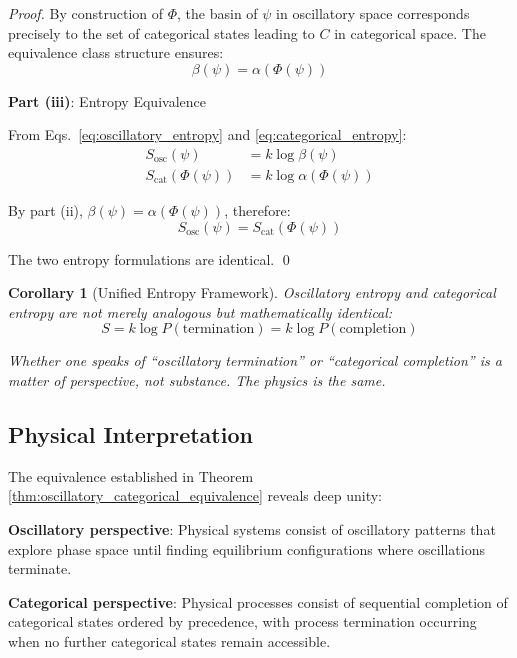 \documentclass[12pt,a4paper]{article}
\newtheorem{corollary}{Corollary}
\begin{document}
\begin{proof}
By construction of $\Phi$, the basin of $\psi$ in oscillatory space corresponds precisely to the set of categorical states leading to $C$ in categorical space. The equivalence class structure ensures:
\begin{equation}
\beta(\psi) = \alpha(\Phi(\psi))
\end{equation}

\textbf{Part (iii)}: Entropy Equivalence

From Eqs.~\eqref{eq:oscillatory_entropy} and \eqref{eq:categorical_entropy}:
\begin{align}
S_{\text{osc}}(\psi) &= k \log \beta(\psi) \\
S_{\text{cat}}(\Phi(\psi)) &= k \log \alpha(\Phi(\psi))
\end{align}

By part (ii), $\beta(\psi) = \alpha(\Phi(\psi))$, therefore:
\begin{equation}
S_{\text{osc}}(\psi) = S_{\text{cat}}(\Phi(\psi))
\end{equation}

The two entropy formulations are identical. \qed
\end{proof}

\begin{corollary}[Unified Entropy Framework]
\label{cor:unified_entropy}
Oscillatory entropy and categorical entropy are not merely analogous but mathematically identical:
\begin{equation}
S = k \log P(\text{termination}) = k \log P(\text{completion})
\end{equation}

Whether one speaks of ``oscillatory termination'' or ``categorical completion'' is a matter of perspective, not substance. The physics is the same.
\end{corollary}

\subsection{Physical Interpretation}

The equivalence established in Theorem \ref{thm:oscillatory_categorical_equivalence} reveals deep unity:

\textbf{Oscillatory perspective}: Physical systems consist of oscillatory patterns that explore phase space until finding equilibrium configurations where oscillations terminate.

\textbf{Categorical perspective}: Physical processes consist of sequential completion of categorical states ordered by precedence, with process termination occurring when no further categorical states remain accessible.
\end{document}
